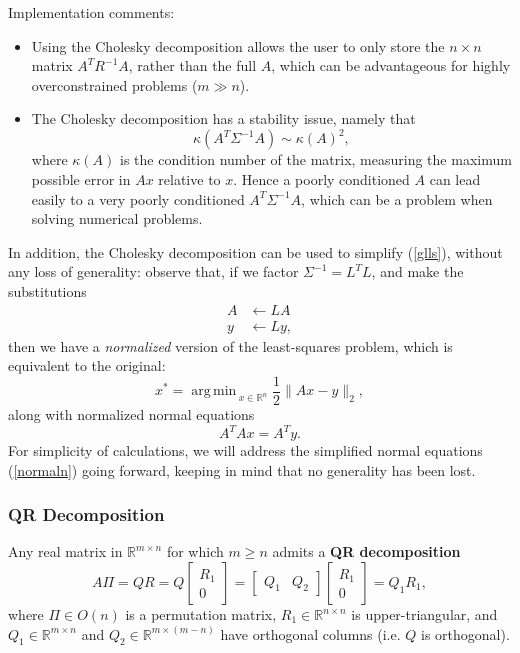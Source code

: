 \documentclass[reqno]{amsart}
\DeclareMathOperator*{\argmin}{arg\,min\,}
\numberwithin{equation}{section}
\begin{document}
Implementation comments:
\begin{itemize}
\item Using the Cholesky decomposition allows the user to only store the $n\times n$ matrix
    $A^T R^{-1} A$, rather than the full $A$, which can be advantageous for highly overconstrained
    problems ($m \gg n$).
\item The Cholesky decomposition has a stability issue, namely that
    $$
    \kappa(A^T \Sigma^{-1} A) \sim \kappa(A)^2,
    $$
    where $\kappa(A)$ is the condition
    number of the matrix, measuring the maximum possible error in $Ax$ relative to $x$. Hence
    a poorly conditioned $A$ can lead easily to a very poorly conditioned $A^T \Sigma^{-1} A$, which
    can be a problem when solving numerical problems.
\end{itemize}

In addition, the Cholesky decomposition can be used to simplify (\ref{glls}), without any
loss of generality: observe that, if we factor $\Sigma^{-1} = L^TL$, and make the
substitutions
\begin{align*}
    A &\leftarrow LA \\
    y &\leftarrow Ly,
\end{align*}
then we have a \emph{normalized} version of the least-squares problem, which is equivalent
to the original:
\begin{equation}
    x^* = \argmin_{x \in \mathbb R^n} \frac12 \| Ax - y\|_2,
\label{gllsn}
\end{equation}
along with normalized normal equations
\begin{equation}
    A^TAx = A^Ty.
\label{normaln}
\end{equation}
For simplicity of calculations, we will address the simplified normal equations
(\ref{normaln}) going forward, keeping in mind that no generality has been lost.

\subsubsection{QR Decomposition}
Any real matrix in $\mathbb R^{m \times n}$ for which $m \ge n$ admits
a \textbf{QR decomposition}
    $$
        A\Pi = QR = Q \begin{bmatrix} R_1 \\ 0 \end{bmatrix}
            = \begin{bmatrix} Q_1 & Q_2 \end{bmatrix}
                \begin{bmatrix} R_1 \\ 0 \end{bmatrix}
                    = Q_1 R_1,
    $$
where $\Pi \in O(n)$ is a permutation matrix,
$R_1 \in \mathbb R^{n \times n}$ is upper-triangular, and
$Q_1 \in \mathbb R^{m \times n}$ and $Q_2 \in \mathbb R^{m \times(m-n)}$
have orthogonal columns (i.e. $Q$ is orthogonal).
\end{document}
